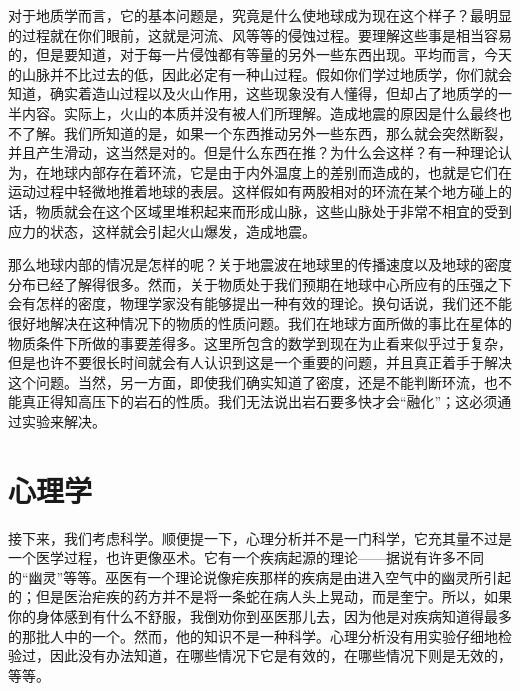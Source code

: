 \documentclass[12pt,oneside]{book}
\begin{document}
\begin{common-format}
对于地质学而言，它的基本问题是，究竟是什么使地球成为现在这个样子？最明显的过程就在你们眼前，这就是河流、风等等的侵蚀过程。要理解这些事是相当容易的，但是要知道，对于每一片侵蚀都有等量的另外一些东西出现。平均而言，今天的山脉并不比过去的低，因此必定有一种山过程。假如你们学过地质学，你们就会知道，确实着造山过程以及火山作用，这些现象没有人懂得，但却占了地质学的一半内容。实际上，火山的本质并没有被人们所理解。造成地震的原因是什么最终也不了解。我们所知道的是，如果一个东西推动另外一些东西，那么就会突然断裂，并且产生滑动，这当然是对的。但是什么东西在推？为什么会这样？有一种理论认为，在地球内部存在着环流，它是由于内外温度上的差别而造成的，也就是它们在运动过程中轻微地推着地球的表层。这样假如有两股相对的环流在某个地方碰上的话，物质就会在这个区域里堆积起来而形成山脉，这些山脉处于非常不相宜的受到应力的状态，这样就会引起火山爆发，造成地震。

那么地球内部的情况是怎样的呢？关于地震波在地球里的传播速度以及地球的密度分布已经了解得很多。然而，关于物质处于我们预期在地球中心所应有的压强之下会有怎样的密度，物理学家没有能够提出一种有效的理论。换句话说，我们还不能很好地解决在这种情况下的物质的性质问题。我们在地球方面所做的事比在星体的物质条件下所做的事要差得多。这里所包含的数学到现在为止看来似乎过于复杂，但是也许不要很长时间就会有人认识到这是一个重要的问题，并且真正着手于解决这个问题。当然，另一方面，即使我们确实知道了密度，还是不能判断环流，也不能真正得知高压下的岩石的性质。我们无法说出岩石要多快才会“融化”；这必须通过实验来解决。


\section{心理学}
接下来，我们考虑科学。顺便提一下，心理分析并不是一门科学，它充其量不过是一个医学过程，也许更像巫术。它有一个疾病起源的理论——据说有许多不同的“幽灵”等等。巫医有一个理论说像疟疾那样的疾病是由进入空气中的幽灵所引起的；但是医治疟疾的药方并不是将一条蛇在病人头上晃动，而是奎宁。所以，如果你的身体感到有什么不舒服，我倒劝你到巫医那儿去，因为他是对疾病知道得最多的那批人中的一个。然而，他的知识不是一种科学。心理分析没有用实验仔细地检验过，因此没有办法知道，在哪些情况下它是有效的，在哪些情况下则是无效的，等等。


\end{common-format}
\end{document}
